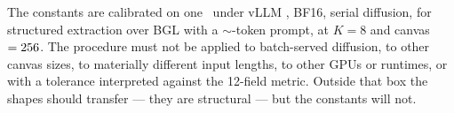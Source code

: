 \begin{caution}
The constants are calibrated on one \gpuModel\ under vLLM \vllmVersion, BF16,
serial diffusion, for structured extraction over BGL with a
$\sim$-token prompt, at $K{=}8$ and canvas $=256$. The
procedure must not be applied to batch-served diffusion, to other canvas
sizes, to materially different input lengths, to other GPUs or runtimes, or
with a tolerance interpreted against the 12-field metric. Outside that box the
shapes should transfer --- they are structural --- but the constants will not.
\end{caution}
